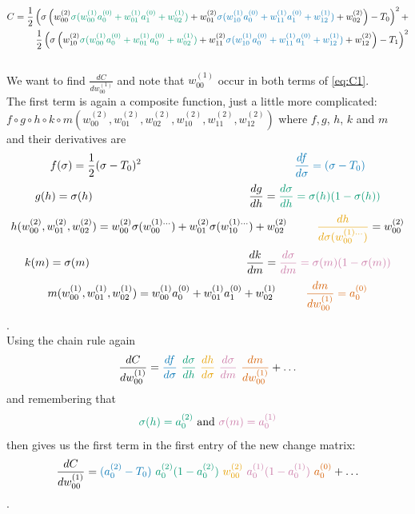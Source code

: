 \documentclass{article}
\begin{document}
\begin{equation} \label{eq:C1}
\begin{aligned}
C = \frac {1}{2} \left(\sigma\left(w_{00}^{(2)}\textcolor{green}{\sigma(w_{00}^{(1)}a_0^{(0)}+w_{01}^{(1)}a_1^{(0)}+w_{02}^{(1)})}
+w_{01}^{(2)}\textcolor{darkblue}{\sigma(w_{10}^{(1)}a_0^{(0)}+w_{11}^{(1)}a_1^{(0)}+w_{12}^{(1)})}+w_{02}^{(2)}\right)-T_0\right)^2 +
\\
\frac {1}{2}\left(\sigma\left(w_{10}^{(2)}\textcolor{green}{\sigma(w_{00}^{(1)}a_0^{(0)}+w_{01}^{(1)}a_0^{(0)}+w_{02}^{(1)})}+w_{11}^{(2)}\textcolor{darkblue}{\sigma(w_{10}^{(1)}a_0^{(0)}+w_{11}^{(1)}a_1^{(0)}+w_{12}^{(1)})}+w_{12}^{(2)}\right)-T_1\right)^2
\end{aligned}
\end{equation}
\\
We want to find $\frac{dC}{dw_{00}^{(1)}}$ and note that $w_{00}^{(1)}$ occur in both terms of \eqref{eq:C1}.
\\
The first term is again a composite function, just a little more complicated: $f \circ g \circ h \circ k \circ m(w_{00}^{(2)}, w_{01}^{(2)}, w_{02}^{(2)}, w_{10}^{(2)}, w_{11}^{(2)},w_{12}^{(2)})$ where $f, g$, $h$, $k$ and $m$ and their derivatives are
$$f(\sigma) = \frac {1}{2}(\sigma-T_0)^2~~~~~~~~~~~~~~~~~~~~~~~~~~~~~~~~~~~~~~~~~\textcolor{darkblue}{\frac{df}{d\sigma} = (\sigma-T_0)}$$
$$g(h) = \sigma(h)~~~~~~~~~~~~~~~~~~~~~~~~~~~~~~~~~~~~~~~~~~\frac{dg}{dh} = \textcolor{green}{\frac{d\sigma}{dh} = \sigma(h)(1 - \sigma(h))}$$
$$h(w_{00}^{(2)}, w_{01}^{(2)}, w_{02}^{(2)}) = w_{00}^{(2)}\sigma(w_{00}^{(1)...})+w_{01}^{(2)}\sigma(w_{10}^{(1)...})+w_{02}^{(2)}~~~~~~~~\textcolor{orange}{\frac{dh}{d\sigma(w_{00}^{(1)...})}} = w_{00}^{(2)}$$
$$k(m) = \sigma(m)~~~~~~~~~~~~~~~~~~~~~~~~~~~~~~~~~~~~~~~~~~\frac{dk}{dm} = \textcolor{lavender}{\frac{d\sigma}{dm} = \sigma(m)(1 - \sigma(m))}$$
$$m(w_{00}^{(1)}, w_{01}^{(1)}, w_{02}^{(1)}) = w_{00}^{(1)}a_0^{(0)}+w_{01}^{(1)}a_1^{(0)}+w_{02}^{(1)}~~~~~~~~\textcolor{orangered}{\frac{dm}{dw_{00}^{(1)}} = a_0^{(0)}}$$.
\\
Using the chain rule again
$$\frac{dC}{dw_{00}^{(1)}} = \textcolor{darkblue}{\frac{df}{d\sigma}}~\textcolor{green}{\frac{d\sigma}{dh}}~\textcolor{orange}{\frac{dh}{d\sigma}}~\textcolor{lavender}{\frac{d\sigma}{dm}}~\textcolor{orangered}{\frac{dm}{dw_{00}^{(1)}}}+\ldots$$
and remembering that $$\textcolor{green}{\sigma(h) = a_0^{(2)}} ~\textnormal{and}~ \textcolor{lavender}{\sigma(m) = a_0^{(1)}}$$
then gives us the first term in the first entry of the new change matrix:
$$\frac{dC}{dw_{00}^{(1)}} = \textcolor{darkblue}{(a_0^{(2)}-T_0)}~\textcolor{green}{a_0^{(2)}(1-a_0^{(2)})}~\textcolor{orange}{w_{00}^{(2)}}~\textcolor{lavender}{a_0^{(1)}(1-a_0^{(1)})}~\textcolor{orangered}{a_0^{(0)}}+\ldots$$.
\end{document}

